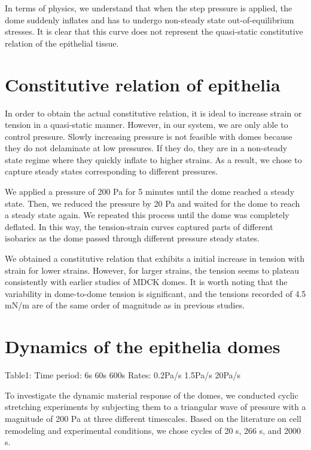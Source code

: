 In terms of physics, we understand that when the step pressure is
applied, the dome suddenly inflates and has to undergo non-steady state
out-of-equilibrium stresses. It is clear that this curve does not
represent the quasi-static constitutive relation of the epithelial
tissue.

\hypertarget{constitutive-relation-of-epithelia}{%
	\section{Constitutive relation of
		epithelia}\label{constitutive-relation-of-epithelia}}

In order to obtain the actual constitutive relation, it is ideal to
increase strain or tension in a quasi-static manner. However, in our
system, we are only able to control pressure. Slowly increasing pressure
is not feasible with domes because they do not delaminate at low
pressures. If they do, they are in a non-steady state regime where they
quickly inflate to higher strains. As a result, we chose to capture
steady states corresponding to different pressures.

We applied a pressure of 200 Pa for 5 minutes until the dome reached a
steady state. Then, we reduced the pressure by 20 Pa and waited for the
dome to reach a steady state again. We repeated this process until the
dome was completely deflated. In this way, the tension-strain curves
captured parts of different isobarics as the dome passed through
different pressure steady states.

We obtained a constitutive relation that exhibits a initial increase in
tension with strain for lower strains. However, for larger strains, the
tension seems to plateau consistently with earlier studies of MDCK
domes. It is worth noting that the variability in dome-to-dome tension
is significant, and the tensions recorded of 4.5 mN/m are of the same
order of magnitude as in previous studies.

\hypertarget{dynamics-of-the-epithelia-domes}{%
	\section{Dynamics of the epithelia
		domes}\label{dynamics-of-the-epithelia-domes}}

Table1: Time period: 6s 60s 600s Rates: 0.2Pa/s 1.5Pa/s 20Pa/s

To investigate the dynamic material response of the domes, we conducted
cyclic stretching experiments by subjecting them to a triangular wave of
pressure with a magnitude of 200 Pa at three different timescales. Based
on the literature on cell remodeling and experimental conditions, we
chose cycles of 20 s, 266 s, and 2000 s.

